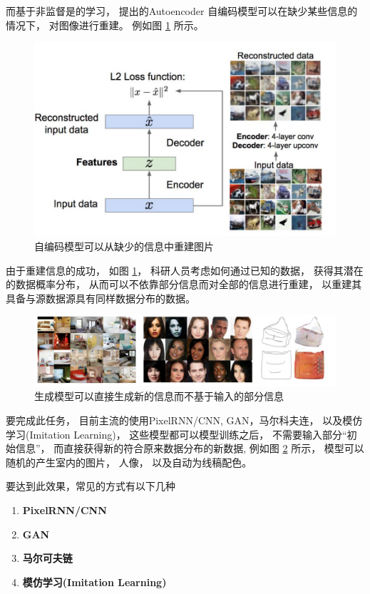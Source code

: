 而基于非监督是的学习， 提出的Autoencoder \cite{} 自编码模型可以在缺少某些信息的情况下， 对图像进行重建。 例如图 \ref{img:autoencoder} 所示。

\begin{figure}[htbp]
    \centering  %
    \includegraphics[width = .55\linewidth]{data/chapter-2/autoencoder.png} %
    \caption{自编码模型可以从缺少的信息中重建图片} %
    \label{img:autoencoder} %
\end{figure}

由于重建信息的成功， 如图 \ref{img:autoencoder}， 科研人员考虑如何通过已知的数据， 获得其潜在的数据概率分布， 从而可以不依靠部分信息而对全部的信息进行重建， 以重建其具备与源数据源具有同样数据分布的数据。 

\begin{figure}[htbp]
    \centering  %
    \includegraphics[width = .55\linewidth]{data/chapter-2/gene.png} %
    \caption{生成模型可以直接生成新的信息而不基于输入的部分信息} %
    \label{img:gene} %
\end{figure}

要完成此任务， 目前主流的使用PixelRNN/CNN, GAN，马尔科夫连， 以及模仿学习(Imitation Learning)， 这些模型都可以模型训练之后， 不需要输入部分“初始信息”， 而直接获得新的符合原来数据分布的新数据, 例如图 \ref{img:gene} 所示， 模型可以随机的产生室内的图片， 人像， 以及自动为线稿配色。  

要达到此效果，常见的方式有以下几种

\begin{enumerate}
\item{\textbf{PixelRNN/CNN}}
\item{\textbf{GAN}}
\item{\textbf{马尔可夫链}}
\item{\textbf{模仿学习(Imitation Learning)}}
\end{enumerate}

